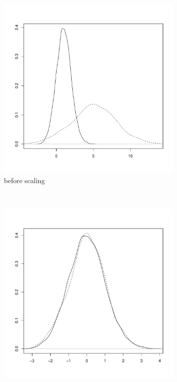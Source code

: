 \begin{figure}[h]
\begin{subfigure}[b]{.5\textwidth}
\centering
\includegraphics[scale=.4]{figures/normalisation-scaled-a.pdf} 
\caption{before scaling}
\end{subfigure}
~
\begin{subfigure}[b]{.5\textwidth}
\centering
\includegraphics[scale=.4]{figures/normalisation-scaled-b.pdf} 

\end{subfigure}
\end{figure}
